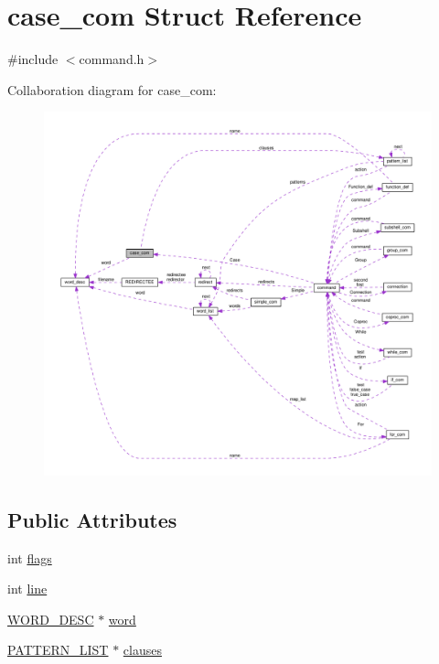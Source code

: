 \hypertarget{structcase__com}{}\section{case\+\_\+com Struct Reference}
\label{structcase__com}


{\ttfamily \#include $<$command.\+h$>$}



Collaboration diagram for case\+\_\+com\+:
\nopagebreak
\begin{figure}[H]
\begin{center}
\leavevmode
\includegraphics[width=350pt]{structcase__com__coll__graph}
\end{center}
\end{figure}
\subsection*{Public Attributes}
\begin{DoxyCompactItemize}
\item 
int \hyperlink{structcase__com_a7c1331e9e068cc68d7202a5258a9b99f}{flags}
\item 
int \hyperlink{structcase__com_a224481775fc2b0ae54084676a332eaf2}{line}
\item 
\hyperlink{command_8h_a3f0cccf333703e5f6c4168be0db675fa}{W\+O\+R\+D\+\_\+\+D\+E\+SC} $\ast$ \hyperlink{structcase__com_a73c5c1e3d71a7d4615708e5b6afd4e34}{word}
\item 
\hyperlink{command_8h_a05098e88133e048a1acf396288758a9e}{P\+A\+T\+T\+E\+R\+N\+\_\+\+L\+I\+ST} $\ast$ \hyperlink{structcase__com_a68bcee3c7e8750f04e632c0178dbb574}{clauses}
\end{DoxyCompactItemize}


